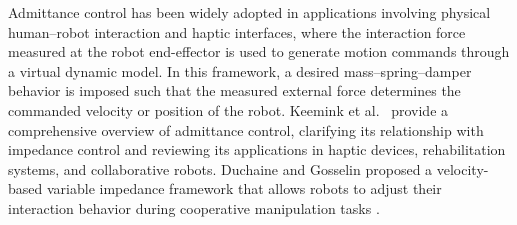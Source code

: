 \documentclass[journal]{IEEEtran}
\begin{document}
Admittance control has been widely adopted in applications involving physical human--robot interaction and haptic interfaces, where the interaction force measured at the robot end-effector is used to generate motion commands through a virtual dynamic model. In this framework, a desired mass--spring--damper behavior is imposed such that the measured external force determines the commanded velocity or position of the robot. Keemink et al.~\cite{Keemink2018} provide a comprehensive overview of admittance control, clarifying its relationship with impedance control and reviewing its applications in haptic devices, rehabilitation systems, and collaborative robots. 
Duchaine and Gosselin proposed a velocity-based variable impedance framework that allows robots to adjust their interaction behavior during cooperative manipulation tasks \cite{Duchaine2007}.



\end{document}
